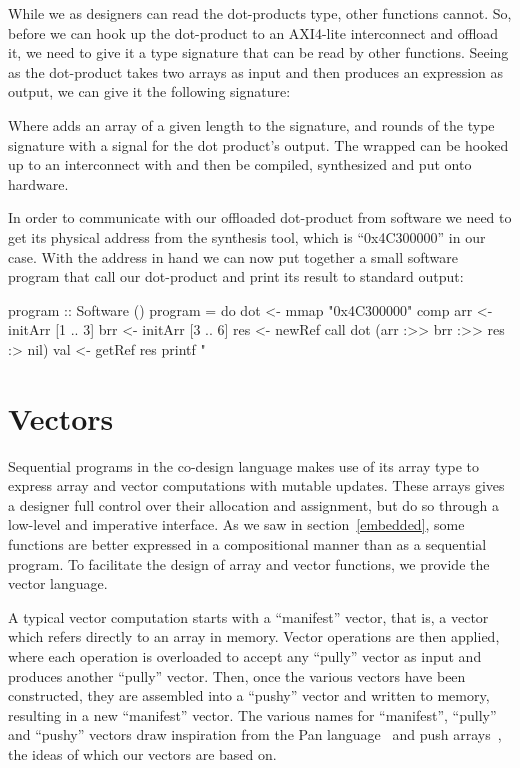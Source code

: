 \documentclass[../paper.tex]{subfiles}
\begin{document}
\noindent While we as designers can read the dot-products type, other functions cannot. So, before we can hook up the dot-product to an AXI4-lite interconnect and offload it, we need to give it a type signature that can be read by other functions. Seeing as the dot-product takes two arrays as input and then produces an expression as output, we can give it the following signature:


\noindent Where  adds an array of a given length to the signature, and  rounds of the type signature with a signal for the dot product's output. The wrapped  can be hooked up to an interconnect with  and then be compiled, synthesized and put onto hardware.

In order to communicate with our offloaded dot-product from software we need to get its physical address from the synthesis tool, which is ``0x4C300000'' in our case. With the address in hand we can now put together a small software program that call our dot-product and print its result to standard output:

\begin{code}
program :: Software ()
program = do
  dot <- mmap "0x4C300000" comp
  arr <- initArr [1 .. 3]
  brr <- initArr [3 .. 6]
  res <- newRef
  call dot (arr :>> brr :>> res :> nil)
  val <- getRef res
  printf "%
\end{code}

\section{Vectors}
\label{vectors}

Sequential programs in the co-design language makes use of its array type to express array and vector computations with mutable updates. These arrays gives a designer full control over their allocation and assignment, but do so through a low-level and imperative interface. As we saw in section~\ref{embedded}, some functions are better expressed in a compositional manner than as a sequential program. To facilitate the design of array and vector functions, we provide the vector language. 

A typical vector computation starts with a ``manifest'' vector, that is, a vector which refers directly to an array in memory. Vector operations are then applied, where each operation is overloaded to accept any ``pully'' vector as input and produces another ``pully'' vector. Then, once the various vectors have been constructed, they are assembled into a ``pushy'' vector and written to memory, resulting in a new ``manifest'' vector. The various names for ``manifest'', ``pully'' and ``pushy'' vectors draw inspiration from the Pan language~\cite{elliott2003} and push arrays~\cite{claessen2012}, the ideas of which our vectors are based on.
\end{document}
